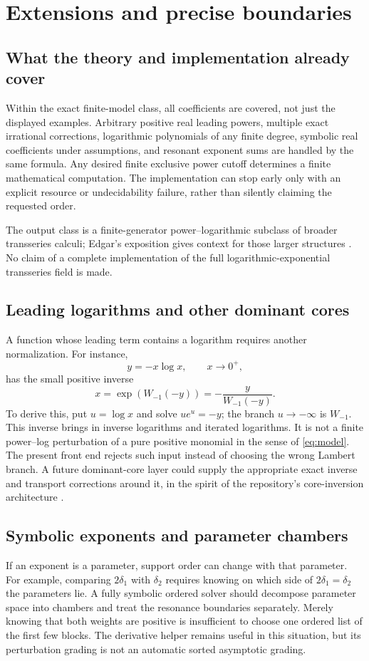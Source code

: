 \documentclass[11pt,a4paper]{article}
\numberwithin{equation}{section}
\theoremstyle{definition}
\begin{document}
\section{Extensions and precise boundaries}\label{sec:limits}

\subsection{What the theory and implementation already cover}
Within the exact finite-model class, all coefficients are covered, not
just the displayed examples. Arbitrary positive real leading powers,
multiple exact irrational corrections, logarithmic polynomials of any
finite degree, symbolic real coefficients under assumptions, and resonant
exponent sums are handled by the same formula. Any desired finite
exclusive power cutoff determines a finite mathematical computation.
The implementation can stop early only with an explicit resource or
undecidability failure, rather than silently claiming the requested order.

The output class is a finite-generator power--logarithmic subclass of
broader transseries calculi; Edgar's exposition gives context for those
larger structures \cite{edgar}. No claim of a complete implementation of
the full logarithmic-exponential transseries field is made.

\subsection{Leading logarithms and other dominant cores}
A function whose leading term contains a logarithm requires another
normalization. For instance,
\[
 y=-x\log x,\qquad x\to0^+,
\]
has the small positive inverse
\[
 x=\exp(W_{-1}(-y))=-\frac{y}{W_{-1}(-y)}.
\]
To derive this, put $u=\log x$ and solve $u e^u=-y$; the branch
$u\to-\infty$ is $W_{-1}$. This inverse brings in inverse logarithms
and iterated logarithms. It is not a finite power--log perturbation of a
pure positive monomial in the sense of \eqref{eq:model}.
The present front end rejects such input instead of choosing the wrong
Lambert branch. A future dominant-core layer could supply the appropriate
exact inverse and transport corrections around it, in the spirit of the
repository's core-inversion architecture \cite{repo}.

\subsection{Symbolic exponents and parameter chambers}
If an exponent is a parameter, support order can change with that
parameter. For example, comparing $2\delta_1$ with $\delta_2$ requires
knowing on which side of $2\delta_1=\delta_2$ the parameters lie.
A fully symbolic ordered solver should decompose parameter space into
chambers and treat the resonance boundaries separately. Merely knowing
that both weights are positive is insufficient to choose one ordered
list of the first few blocks. The derivative helper remains useful in
this situation, but its perturbation grading is not an automatic sorted
asymptotic grading.
\end{document}
